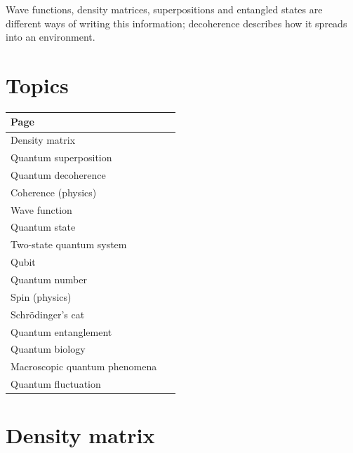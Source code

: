 \documentclass[11pt,oneside]{book}
\begin{document}
Wave functions, density matrices, superpositions and entangled states are different ways of writing this information; decoherence describes how it spreads into an environment.

\section*{Topics}

\begin{longtable}{p{0.92\linewidth}}
\toprule
Page \\
\midrule
\endhead
{}\label{page:density-matrix}Density matrix \\
\label{page:quantum-superposition}Quantum superposition \\
\label{page:quantum-decoherence}Quantum decoherence \\
\label{page:coherence-physics}Coherence (physics) \\
\label{page:wave-function}Wave function \\
\label{page:quantum-state}Quantum state \\
\label{page:two-state-quantum-system}Two-state quantum system \\
\label{page:qubit}Qubit \\
\label{page:quantum-number}Quantum number \\
\label{page:spin-physics}Spin (physics) \\
\label{page:schr-dinger-s-cat}Schrödinger's cat \\
\label{page:quantum-entanglement}Quantum entanglement \\
\label{page:quantum-biology}Quantum biology \\
\label{page:macroscopic-quantum-phenomena}Macroscopic quantum phenomena \\
\label{page:quantum-fluctuation}Quantum fluctuation \\
\bottomrule
\end{longtable}

\clearpage

\section{Density matrix}

\label{topic:density-matrix}
\end{document}
